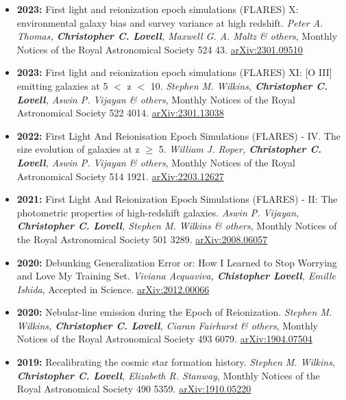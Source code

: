 \begin{itemize}
\item \textbf{2023:} First light and reionization epoch simulations (FLARES) X: environmental galaxy bias and survey variance at high redshift. \textit{Peter A. Thomas, \textbf{Christopher C. Lovell}, Maxwell G. A. Maltz \& others}, Monthly Notices of the Royal Astronomical Society 524 43. \href{https://arxiv.org/abs/2301.09510}{arXiv:2301.09510}
\item \textbf{2023:} First light and reionization epoch simulations (FLARES) XI: [O III] emitting galaxies at 5 $<$ z $<$ 10. \textit{Stephen M. Wilkins, \textbf{Christopher C. Lovell}, Aswin P. Vijayan \& others}, Monthly Notices of the Royal Astronomical Society 522 4014. \href{https://arxiv.org/abs/2301.13038}{arXiv:2301.13038}
\item \textbf{2022:} First Light And Reionisation Epoch Simulations (FLARES) - IV. The size evolution of galaxies at z $\geq$ 5. \textit{William J. Roper, \textbf{Christopher C. Lovell}, Aswin P. Vijayan \& others}, Monthly Notices of the Royal Astronomical Society 514 1921. \href{https://arxiv.org/abs/2203.12627}{arXiv:2203.12627}
\item \textbf{2021:} First Light And Reionization Epoch Simulations (FLARES) - II: The photometric properties of high-redshift galaxies. \textit{Aswin P. Vijayan, \textbf{Christopher C. Lovell}, Stephen M. Wilkins \& others}, Monthly Notices of the Royal Astronomical Society 501 3289. \href{https://arxiv.org/abs/2008.06057}{arXiv:2008.06057}
\item \textbf{2020:} Debunking Generalization Error or: How I Learned to Stop Worrying and Love My Training Set. \textit{Viviana Acquaviva, \textbf{Chistopher Lovell}, Emille Ishida}, Accepted in Science. \href{https://arxiv.org/abs/2012.00066}{arXiv:2012.00066}
\item \textbf{2020:} Nebular-line emission during the Epoch of Reionization. \textit{Stephen M. Wilkins, \textbf{Christopher C. Lovell}, Ciaran Fairhurst \& others}, Monthly Notices of the Royal Astronomical Society 493 6079. \href{https://arxiv.org/abs/1904.07504}{arXiv:1904.07504}
\item \textbf{2019:} Recalibrating the cosmic star formation history. \textit{Stephen M. Wilkins, \textbf{Christopher C. Lovell}, Elizabeth R. Stanway}, Monthly Notices of the Royal Astronomical Society 490 5359. \href{https://arxiv.org/abs/1910.05220}{arXiv:1910.05220}
\end{itemize}

